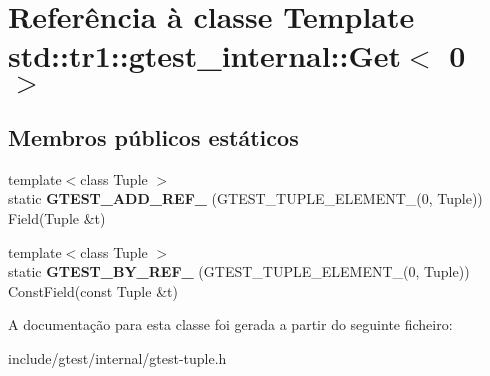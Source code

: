 \hypertarget{classstd_1_1tr1_1_1gtest__internal_1_1Get_3_010_01_4}{\section{Referência à classe Template std\-:\-:tr1\-:\-:gtest\-\_\-internal\-:\-:Get$<$ 0 $>$}
\label{classstd_1_1tr1_1_1gtest__internal_1_1Get_3_010_01_4}
}
\subsection*{Membros públicos estáticos}
\begin{DoxyCompactItemize}
\item 
\hypertarget{classstd_1_1tr1_1_1gtest__internal_1_1Get_3_010_01_4_a74beca3869fddfe42ee608b7f4cacb96}{{\footnotesize template$<$class Tuple $>$ }\\static {\bfseries G\-T\-E\-S\-T\-\_\-\-A\-D\-D\-\_\-\-R\-E\-F\-\_\-} (G\-T\-E\-S\-T\-\_\-\-T\-U\-P\-L\-E\-\_\-\-E\-L\-E\-M\-E\-N\-T\-\_\-(0, Tuple)) Field(Tuple \&t)}\label{classstd_1_1tr1_1_1gtest__internal_1_1Get_3_010_01_4_a74beca3869fddfe42ee608b7f4cacb96}

\item 
\hypertarget{classstd_1_1tr1_1_1gtest__internal_1_1Get_3_010_01_4_a195b3853de45077f9a324c455f22d7e2}{{\footnotesize template$<$class Tuple $>$ }\\static {\bfseries G\-T\-E\-S\-T\-\_\-\-B\-Y\-\_\-\-R\-E\-F\-\_\-} (G\-T\-E\-S\-T\-\_\-\-T\-U\-P\-L\-E\-\_\-\-E\-L\-E\-M\-E\-N\-T\-\_\-(0, Tuple)) Const\-Field(const Tuple \&t)}\label{classstd_1_1tr1_1_1gtest__internal_1_1Get_3_010_01_4_a195b3853de45077f9a324c455f22d7e2}

\end{DoxyCompactItemize}


A documentação para esta classe foi gerada a partir do seguinte ficheiro\-:\begin{DoxyCompactItemize}
\item 
include/gtest/internal/gtest-\/tuple.\-h\end{DoxyCompactItemize}
